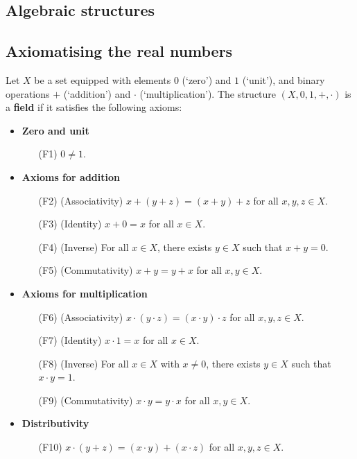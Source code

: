

\subsection*{Algebraic structures}


\subsection*{Axiomatising the real numbers}

\todo{}

\begin{axioms}
\label{axField}
Let $X$ be a set equipped with elements $0$ (`zero') and $1$ (`unit'), and binary operations $+$ (`addition') and $\cdot$ (`multiplication'). The structure $(X,0,1,+,{\cdot})$ is a \textbf{field} if it satisfies the following axioms:
\begin{itemize}
\item \textbf{Zero and unit}
\begin{itemize}[leftmargin=30pt]
\item[(F1)] $0 \ne 1$.
\end{itemize}
\item \textbf{Axioms for addition}
\begin{itemize}
\item[(F2)] (Associativity) $x+(y+z) = (x+y)+z$ for all $x,y,z \in X$.
\item[(F3)] (Identity) $x+0=x$ for all $x \in X$.
\item[(F4)] (Inverse) For all $x \in X$, there exists $y \in X$ such that $x+y=0$.
\item[(F5)] (Commutativity) $x+y=y+x$ for all $x,y \in X$.
\end{itemize}
\item \textbf{Axioms for multiplication}
\begin{itemize}[leftmargin=30pt]
\item[(F6)] (Associativity) $x \cdot (y \cdot z) = (x \cdot y) \cdot z$ for all $x,y,z \in X$.
\item[(F7)] (Identity) $x \cdot 1 = x$ for all $x \in X$.
\item[(F8)] (Inverse) For all $x \in X$ with $x \ne 0$, there exists $y \in X$ such that $x \cdot y = 1$.
\item[(F9)] (Commutativity) $x \cdot y = y \cdot x$ for all $x,y \in X$.
\end{itemize}
\item \textbf{Distributivity}
\begin{itemize}[leftmargin=30pt]
\item[(F10)] $x \cdot (y + z) = (x \cdot y) + (x \cdot z)$ for all $x,y,z \in X$.
\end{itemize}
\end{itemize}
\end{axioms}

